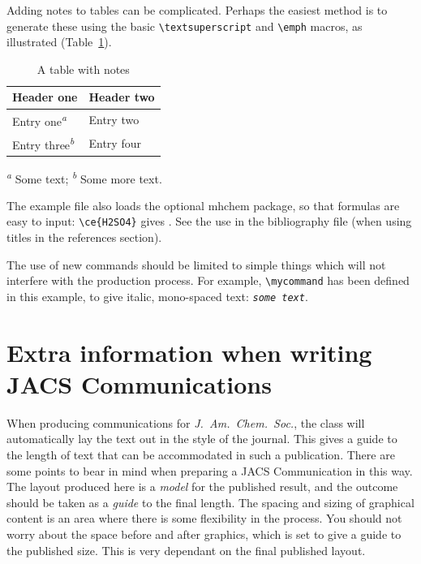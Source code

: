 \documentclass[journal=jacsat,manuscript=article]{achemso}
\newcommand*\mycommand[1]{\texttt{\emph{#1}}}
\begin{document}
Adding notes to tables can be complicated.  Perhaps the easiest
method is to generate these using the basic
\texttt{\textbackslash textsuperscript} and
\texttt{\textbackslash emph} macros, as illustrated (Table~\ref{tbl:notes}).
\begin{table}
  \caption{A table with notes}
  \label{tbl:notes}
  \begin{tabular}{ll}
    \hline
    Header one                            & Header two \\
    \hline
    Entry one\textsuperscript{\emph{a}}   & Entry two  \\
    Entry three\textsuperscript{\emph{b}} & Entry four \\
    \hline
  \end{tabular}

  \textsuperscript{\emph{a}} Some text;
  \textsuperscript{\emph{b}} Some more text.
\end{table}

The example file also loads the optional \textsf{mhchem} package, so
that formulas are easy to input: \texttt{\textbackslash ce\{H2SO4\}}
gives .  See the use in the bibliography file (when using
titles in the references section).

The use of new commands should be limited to simple things which will
not interfere with the production process.  For example,
\texttt{\textbackslash mycommand} has been defined in this example,
to give italic, mono-spaced text: \mycommand{some text}.

\section{Extra information when writing JACS Communications}

When producing communications for \emph{J.~Am.\ Chem.\ Soc.}, the
class will automatically lay the text out in the style of the
journal. This gives a guide to the length of text that can be
accommodated in such a publication. There are some points to bear in
mind when preparing a JACS Communication in this way.  The layout
produced here is a \emph{model} for the published result, and the
outcome should be taken as a \emph{guide} to the final length. The
spacing and sizing of graphical content is an area where there is
some flexibility in the process.  You should not worry about the
space before and after graphics, which is set to give a guide to the
published size. This is very dependant on the final published layout.
\end{document}
